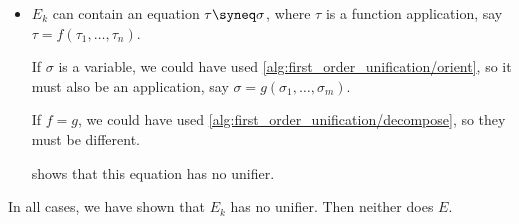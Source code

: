 \begin{defproof}
\begin{itemize}
    \item \( E_k \) can contain an equation \( \tau \syneq \sigma \), where \( \tau \) is a function application, say \( \tau = f(\tau_1, \ldots, \tau_n) \).

    If \( \sigma \) is a variable, we could have used \cref{alg:first_order_unification/orient}, so it must also be an application, say \( \sigma = g(\sigma_1, \ldots, \sigma_m) \).

    If \( f = g \), we could have used \cref{alg:first_order_unification/decompose}, so they must be different.

     shows that this equation has no unifier.
  \end{itemize}

  In all cases, we have shown that \( E_k \) has no unifier. Then neither does \( E \).
\end{defproof}

